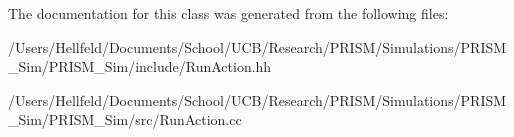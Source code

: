 The documentation for this class was generated from the following files\+:\begin{DoxyCompactItemize}
\item 
/\+Users/\+Hellfeld/\+Documents/\+School/\+U\+C\+B/\+Research/\+P\+R\+I\+S\+M/\+Simulations/\+P\+R\+I\+S\+M\+\_\+\+Sim/\+P\+R\+I\+S\+M\+\_\+\+Sim/include/Run\+Action.\+hh\item 
/\+Users/\+Hellfeld/\+Documents/\+School/\+U\+C\+B/\+Research/\+P\+R\+I\+S\+M/\+Simulations/\+P\+R\+I\+S\+M\+\_\+\+Sim/\+P\+R\+I\+S\+M\+\_\+\+Sim/src/Run\+Action.\+cc\end{DoxyCompactItemize}
